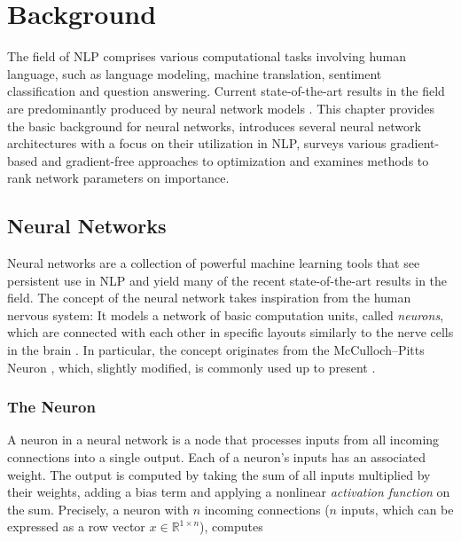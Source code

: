 \chapter{Background}\label{chapter:background}
The field of \ac{NLP} comprises various computational tasks 
involving human language, such as language modeling, 
machine translation, sentiment classification
and question answering. Current state-of-the-art results 
in the field are predominantly 
produced by neural network models \parencite{goldberg2016primer}.
This chapter provides the basic background for neural networks, 
introduces several neural network architectures with 
a focus on their utilization in \ac{NLP}, surveys various 
gradient-based and gradient-free approaches to optimization 
and examines methods to rank network parameters on importance.

\section{Neural Networks} \label{section:neuralnetworks}
Neural networks are a collection of powerful machine learning tools
that see persistent use in \ac{NLP} 
and yield many of the 
recent state-of-the-art results in the field. The concept of the 
neural network takes inspiration from the human nervous system:
It models a network of basic computation units, called \textit{neurons}, 
which are connected with each other in specific layouts
similarly to the nerve cells in the brain \parencite[Chapter 1.2]{neuronbook}. 
In particular, the concept 
originates from the McCulloch–Pitts Neuron \parencite{mcculloch},
which, slightly modified, is commonly used up to present \parencite{perceptronbook}.

\subsection{The Neuron}
A neuron in a neural network is a node that processes inputs 
from all incoming connections into a single output. 
Each of a neuron's inputs has an associated weight. 
The output is computed by taking the sum of all inputs
multiplied by their weights, adding a bias term and applying
a nonlinear \textit{activation function} on the sum. 
Precisely, a neuron with \(n\) incoming connections (\(n\) 
inputs, which can be expressed as a row vector \(x \in \mathbb{R}^{1\times n}\)),
computes 

